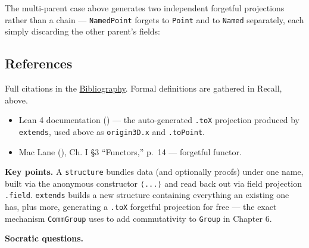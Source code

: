 The multi-parent case above generates two independent forgetful projections rather than a chain --- \texttt{NamedPoint} forgets to \texttt{Point} and to \texttt{Named} separately, each simply discarding the other parent's fields:

\begin{center}

\end{center}

\subsection{References}\label{sec:02-functions-and-structures:03-extending-structures:4}

Full citations in the \hyperref[sec:root:bibliography:1]{Bibliography}. Formal definitions are gathered in Recall, above.

\begin{itemize}
\tightlist
\item
  Lean 4 documentation (\cite{LeanDocs}) --- the auto-generated \texttt{.toX} projection produced by \texttt{extends}, used above as \texttt{origin3D.x} and \texttt{.toPoint}.
\item
  Mac Lane (\cite{MacLane1998}), Ch. I §3 ``Functors,'' p.~14 --- forgetful functor.
\end{itemize}

\textbf{Key points.} A \texttt{structure} bundles data (and optionally proofs) under one name, built via the anonymous constructor \texttt{⟨...⟩} and read back out via field projection \texttt{.field}. \texttt{extends} builds a new structure containing everything an existing one has, plus more, generating a \texttt{.toX} forgetful projection for free --- the exact mechanism \texttt{CommGroup} uses to add commutativity to \texttt{Group} in Chapter 6.

\textbf{Socratic questions.}

